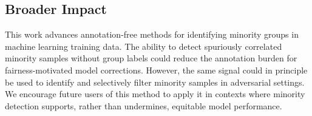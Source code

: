 \subsection*{Broader Impact}

This work advances annotation-free methods for identifying minority groups in machine learning training data. The ability to detect spuriously correlated minority samples without group labels could reduce the annotation burden for fairness-motivated model corrections. However, the same signal could in principle be used to identify and selectively filter minority samples in adversarial settings. We encourage future users of this method to apply it in contexts where minority detection supports, rather than undermines, equitable model performance.
